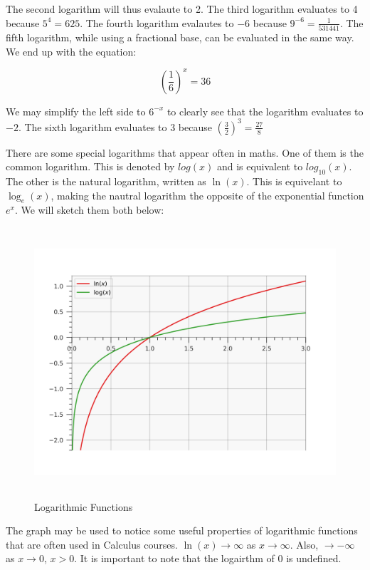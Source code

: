 \documentclass[12pt]{article}
\theoremstyle{definition}
\begin{document}
The second logarithm will thus evalaute to 2.
The third logarithm evaluates to 4 because $5^4=625$.
The fourth logarithm evalautes to $-6$ because $9^{-6}=\frac{1}{531441}$.
The fifth logarithm, while using a fractional base, can be evaluated in the same way.
We end up with the equation:

\begin{equation}
    \left(\frac{1}{6}\right)^x = 36
\end{equation}

We may simplify the left side to $6^{-x}$ to clearly see that the logarithm evaluates to $-2$.
The sixth logarithm evaluates to 3 because $\left(\frac{3}{2}\right)^3 = \frac{27}{8}$

There are some special logarithms that appear often in maths.
One of them is the common logarithm.
This is denoted by $log(x)$ and is equivalent to $log_10(x)$.
The other is the natural logarithm, written as $\ln(x)$.
This is equivelant to $\log_e(x)$, making the nautral logarithm the opposite of the exponential function $e^x$.
We will sketch them both below:

\begin{figure}[H]
    \centering
    \includegraphics[width=12.5cm, height=10cm]{logarithmic_functions.png}
    \caption{Logarithmic Functions}
    \label{fig:fig3}
\end{figure}

The graph may be used to notice some useful properties of logarithmic functions that are often used in Calculus courses.
$\ln(x) \rightarrow \infty$ as $x \rightarrow \infty$.
Also, $\rightarrow -\infty$ as $x \rightarrow 0$, $x>0$.
It is important to note that the logairthm of 0 is undefined.
\end{document}
